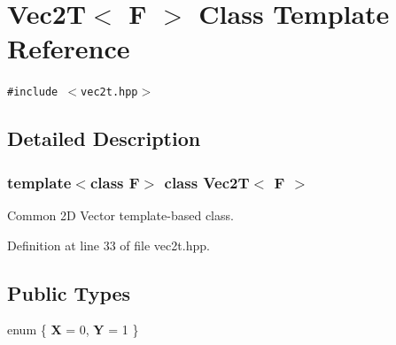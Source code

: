 \section{Vec2T$<$ F $>$ Class Template Reference}
\label{classVec2T}
{\tt \#include $<$vec2t.hpp$>$}



\subsection{Detailed Description}
\subsubsection*{template$<$class F$>$ class Vec2T$<$ F $>$}

Common 2D Vector template-based class. 



Definition at line 33 of file vec2t.hpp.\subsection*{Public Types}
\begin{CompactItemize}
\item 
enum \{ {\bf X} = 0, 
{\bf Y} = 1
 \}
\end{CompactItemize}
